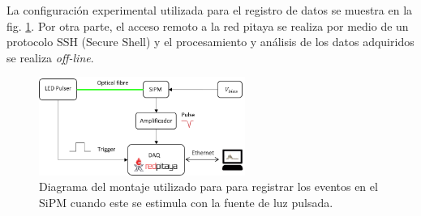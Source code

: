 La configuración experimental utilizada para el registro de datos se muestra en la fig. \ref{fig:Data_system}. Por otra parte, el acceso remoto a la red pitaya se realiza por medio de un protocolo SSH (Secure Shell) y el procesamiento y análisis de los datos adquiridos se realiza \textit{off-line}. 
\begin{figure}[h!]
\begin{centering}
  \includegraphics[width=0.6\textwidth]{Images/LED_diagrama.PNG}
    \caption{Diagrama del montaje utilizado para para registrar los eventos en el SiPM cuando este se estimula con la fuente de luz pulsada.}
    \label{fig:Data_system}
  \par\end{centering}
\end{figure}
